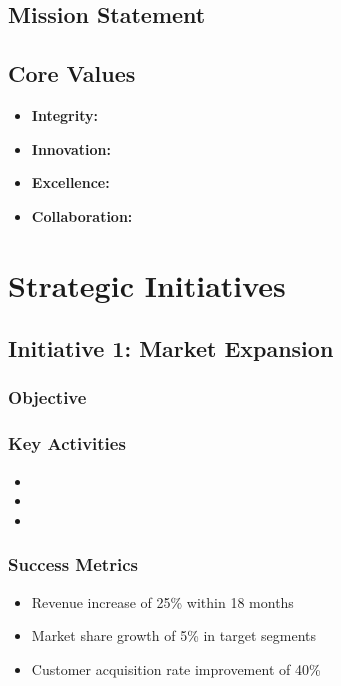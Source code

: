 \documentclass[11pt,a4paper]{article}
\begin{document}
\subsection{Mission Statement}

\lipsum[14-15]

\subsection{Core Values}

\begin{itemize}[leftmargin=*]
  \item \textbf{Integrity:} \lipsum[16][1-2]
  \item \textbf{Innovation:} \lipsum[17][1-2]
  \item \textbf{Excellence:} \lipsum[18][1-2]
  \item \textbf{Collaboration:} \lipsum[19][1-2]
\end{itemize}

\section{Strategic Initiatives}

\subsection{Initiative 1: Market Expansion}

\subsubsection{Objective}
\lipsum[20][1-3]

\subsubsection{Key Activities}
\begin{itemize}[leftmargin=*]
  \item \lipsum[21][1-2]
  \item \lipsum[22][1-2]
  \item \lipsum[23][1-2]
\end{itemize}

\subsubsection{Success Metrics}
\begin{itemize}[leftmargin=*]
  \item Revenue increase of 25\% within 18 months
  \item Market share growth of 5\% in target segments
  \item Customer acquisition rate improvement of 40\%
\end{itemize}
\end{document}
